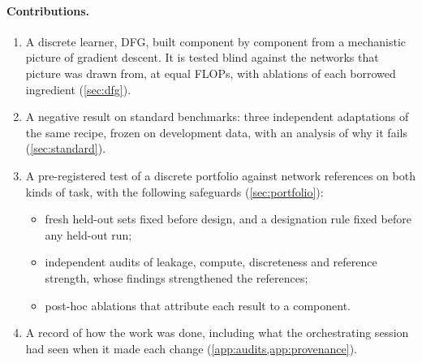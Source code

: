 \paragraph{Contributions.}
\begin{enumerate}
\item A discrete learner, DFG, built component by component from a mechanistic picture of gradient descent. It is tested blind against the networks that picture was drawn from, at equal FLOPs, with ablations of each borrowed ingredient (\cref{sec:dfg}).
\item A negative result on standard benchmarks: three independent adaptations of the same recipe, frozen on development data, with an analysis of why it fails (\cref{sec:standard}).
\item A pre-registered test of a discrete portfolio against network references on both kinds of task, with the following safeguards (\cref{sec:portfolio}):
  \begin{itemize}
  \item fresh held-out sets fixed before design, and a designation rule fixed before any held-out run;
  \item independent audits of leakage, compute, discreteness and reference strength, whose findings strengthened the references;
  \item post-hoc ablations that attribute each result to a component.
  \end{itemize}
\item A record of how the work was done, including what the orchestrating session had seen when it made each change (\cref{app:audits,app:provenance}).
\end{enumerate}

